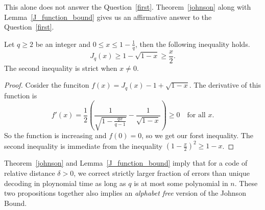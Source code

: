 	This alone does not answer the Question~\ref{first}. Theorem~\ref{johnson} along with Lemma~\ref{J_function_bound} gives us an affirmative answer to the Question~\ref{first}.
	
	\begin{lemma}[]
		\label{J_function_bound}
		Let $q\geq 2$ be an integer and $0\leq x\leq 1-\frac{1}{q}$, then the following inequality holds.
		\[
		J_q(x) \geq 1 - \sqrt{1-x} \geq \frac{x}{2}.
		\]
		The second inequality is strict when $x\neq0$.
	\end{lemma}
	
	\begin{proof}
		Cosider the funciton $f(x) = J_q(x) - 1 + \sqrt{1-x}$. The derivative of this function is 
		\[
		f'(x) = \frac{1}{2}\left(\frac{1}{\sqrt{1 - \frac{qx}{q-1}}} - \frac{1}{\sqrt{1-x}}\right) \geq 0 \quad \text{for all $x$.}
		\]
		So the function is increasing and $f(0) = 0$, so we get our forst inequality. The second inequality is immediate from the inequality $(1-\frac{x}{2})^2\geq 1-x$.
	\end{proof}
	
	Theorem~\ref{johnson} and Lemma~\ref{J_function_bound} imply that for a code of relative distance $\delta>0$, we correct strictly larger fraction of errors than unique decoding in ploynomial time as long as $q$ is at most some polynomial in $n$. These two propositions together also implies an \emph{alphabet free} version of the Johnson Bound.
	
